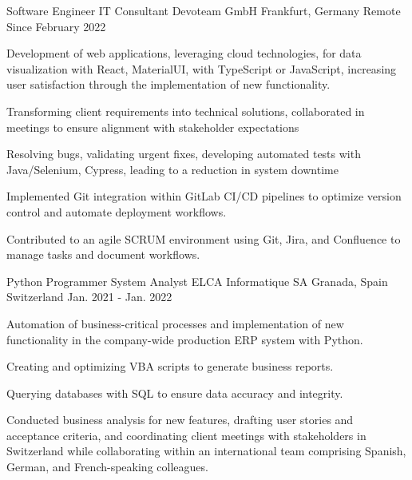 

\begin{cventries}

  \cventry
    {Software Engineer {\enskip\cdotp\enskip} IT Consultant} %
    {Devoteam GmbH} %
    {Frankfurt, Germany {\enskip\cdotp\enskip} Remote} %
    {Since February 2022} %
    {
      \begin{cvitems} %
        \item Development of web applications, leveraging cloud technologies, for data visualization with React, MaterialUI, with TypeScript or JavaScript, increasing user satisfaction through the implementation of new functionality.
 \item Transforming client requirements into technical solutions, collaborated in meetings to ensure alignment with stakeholder expectations
     \item Resolving bugs, validating urgent fixes, developing automated tests with Java/Selenium, Cypress, leading to a reduction in system downtime
    \item Implemented Git integration within GitLab CI/CD pipelines to optimize version control and automate deployment workflows.
    \item Contributed to an agile SCRUM environment using Git, Jira, and Confluence to manage tasks and document workflows.
      \end{cvitems}
    }

  \cventry
    {Python Programmer {\enskip\cdotp\enskip} System Analyst}
    {ELCA Informatique SA}
    {Granada, Spain {\enskip\cdotp\enskip} Switzerland}
    {Jan. 2021 - Jan. 2022}
    {
      \begin{cvitems}
        \item Automation of business-critical processes and implementation of new functionality in the company-wide production ERP system with Python.
    \item Creating and optimizing VBA scripts to generate business reports.
    \item Querying databases with SQL to ensure data accuracy and integrity.
    \item Conducted business analysis for new features, drafting user stories and acceptance criteria, and coordinating client meetings with stakeholders in Switzerland while collaborating within an international team comprising Spanish, German, and French-speaking colleagues.
      \end{cvitems}
    }


\end{cventries}
